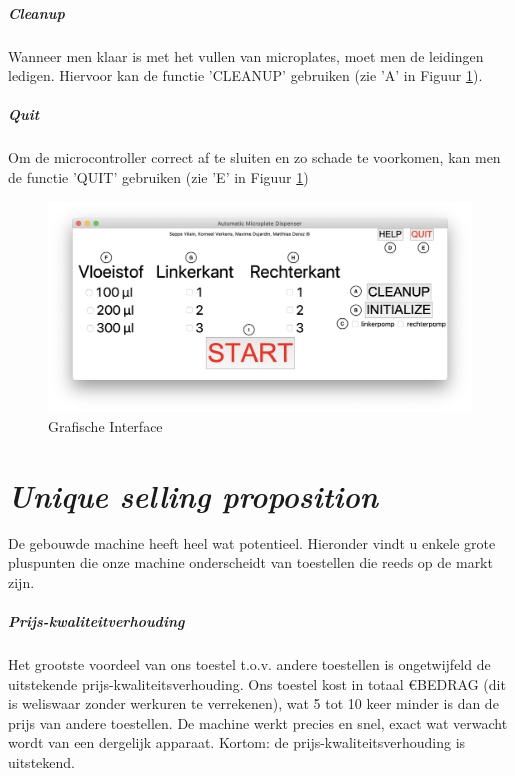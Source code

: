\documentclass[a4paper,twoside,kulak]{kulakreport} %
\begin{document}
\paragraph{Cleanup}
Wanneer men klaar is met het vullen van microplates, moet men de leidingen ledigen. Hiervoor kan de functie 'CLEANUP' gebruiken (zie 'A' in Figuur \ref{fig: Grafische interface}).
\paragraph{Quit}
Om de microcontroller correct af te sluiten en zo schade te voorkomen, kan men de functie 'QUIT' gebruiken (zie 'E' in Figuur \ref{fig: Grafische interface})

\begin{figure}[h]

	\includegraphics[width=1.3\linewidth]{GI_letters.png}
	\caption{Grafische Interface}
	\label{fig: Grafische interface}
	
\end{figure} 


\chapter{\textit{Unique selling proposition}}

De gebouwde machine heeft heel wat potentieel. Hieronder vindt u enkele grote pluspunten die onze machine onderscheidt van toestellen die reeds op de markt zijn.

\paragraph{Prijs-kwaliteitverhouding}

Het grootste voordeel van ons toestel t.o.v. andere toestellen is ongetwijfeld de uitstekende prijs-kwaliteitsverhouding. Ons toestel kost in totaal \euro BEDRAG (dit is weliswaar zonder werkuren te verrekenen), wat 5 tot 10 keer minder is dan de prijs van andere toestellen. De machine werkt precies en snel, exact wat verwacht wordt van een dergelijk apparaat. Kortom: de prijs-kwaliteitsverhouding is uitstekend.
\end{document}
